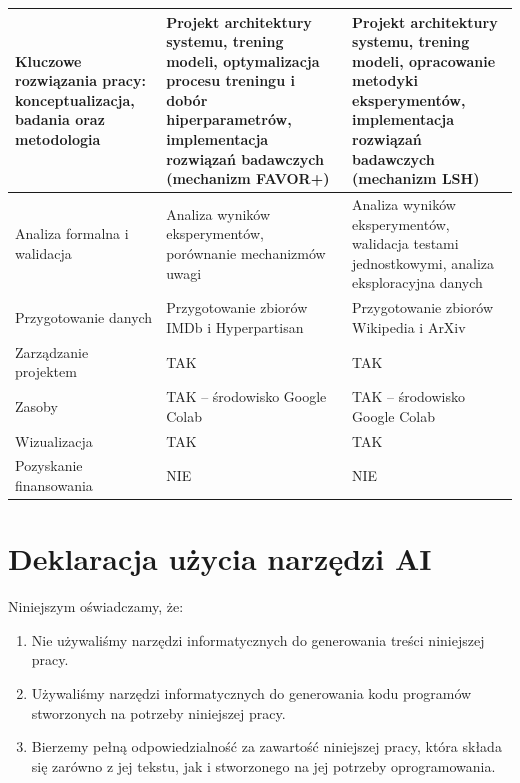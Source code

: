 \documentclass[a4paper,11pt,twoside]{report}
\theoremstyle{definition}
\begin{document}
\begin{table}[!h]
\begin{tabular}{|
    >{\raggedright\arraybackslash}p{5.6cm}|
    >{\raggedright\arraybackslash}p{4.2cm}|
    >{\raggedright\arraybackslash}p{4.2cm}|
}
Kluczowe rozwiązania pracy:\newline
konceptualizacja, badania oraz metodologia &
Projekt architektury systemu, trening modeli, optymalizacja procesu
treningu i dobór hiperparametrów, implementacja rozwiązań badawczych
(mechanizm FAVOR+) &
Projekt architektury systemu, trening modeli, opracowanie metodyki
eksperymentów, implementacja rozwiązań badawczych
(mechanizm LSH) \\
\hline

Analiza formalna i walidacja &
Analiza wyników eksperymentów, porównanie mechanizmów uwagi &
Analiza wyników eksperymentów, walidacja testami jednostkowymi,
analiza eksploracyjna danych \\
\hline

Przygotowanie danych &
Przygotowanie zbiorów IMDb i Hyperpartisan &
Przygotowanie zbiorów Wikipedia i ArXiv \\
\hline

Zarządzanie projektem &
TAK &
TAK \\
\hline

Zasoby &
TAK -- środowisko Google Colab &
TAK -- środowisko Google Colab \\
\hline 

Wizualizacja &
TAK &
TAK \\
\hline

Pozyskanie finansowania &
NIE &
NIE \\
\hline

\end{tabular}
\end{table}



\newpage



\section*{Deklaracja użycia narzędzi AI}
\vspace{3pt}

\normalsize
Niniejszym oświadczamy, że:
\begin{enumerate}
    \item Nie używaliśmy narzędzi informatycznych do generowania treści niniejszej pracy.
    \item Używaliśmy narzędzi informatycznych do generowania kodu programów stworzonych na potrzeby niniejszej pracy.
    \item Bierzemy pełną odpowiedzialność za zawartość niniejszej pracy, która składa się zarówno z jej tekstu, jak i stworzonego na jej potrzeby oprogramowania.
\end{enumerate}
\end{document}
